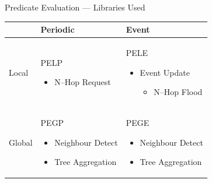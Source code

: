 \documentclass[usenames,dvipsnames]{beamer}
\begin{document}
\begin{frame}{Predicate Evaluation --- Libraries Used}
\begin{table}[H]
\centering
\begin{tabular}{| m{0.9cm} | m{4.2cm} | m{4.2cm} |}
\hline
~ & \centering Periodic & \centering Event\tabularnewline
\hline
Local & PELP
	\begin{itemize}
		\item N--Hop Request
	\end{itemize}
 & PELE
	\begin{itemize}
		\item Event Update
			\begin{itemize}
				\item N--Hop Flood
			\end{itemize}
	\end{itemize}\\
\hline
Global & PEGP
	\begin{itemize}
		\item Neighbour Detect
		\item Tree Aggregation
	\end{itemize}
 & PEGE
	\begin{itemize}
		\item Neighbour Detect
		\item Tree Aggregation
	\end{itemize}\\
\hline
\end{tabular}
\end{table}
\end{frame}
\end{document}
